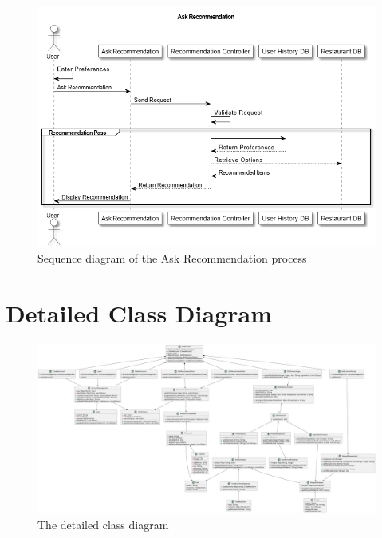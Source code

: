 \documentclass[]{article}
\begin{document}
\begin{figure}[H]
	\centering
	\includegraphics[width=\textwidth]{image/D3_sequence_diagrams/ask_recommendation.png}
	\caption{Sequence diagram of the Ask Recommendation process}
	\label{fig:ask_recommendation_sequence}
\end{figure}



\section{Detailed Class Diagram}
\label{sec:detailed_class_diagram}
\begin{figure}[H]
	\centering
   \includegraphics[width=\textwidth]{image/detailedClassDiagram.png}
   \caption{The detailed class diagram}
\end{figure}
\end{document}
